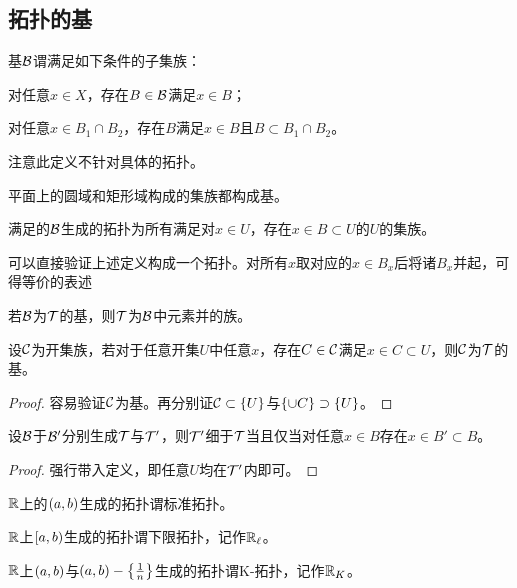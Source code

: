 \documentclass{ctexrep}
\begin{document}
  \subsection{拓扑的基}
  \begin{definition}
  \label{def:tb}
  基$\mathcal{B}$谓满足如下条件的子集族：
  \begin{cenum}
    \item 对任意$x\in X$，存在$B\in\mathcal{B}$满足$x\in B$；
    \item 对任意$x\in B_1\cap B_2$，存在$B$满足$x\in B$且$B\subset B_1\cap B_2$。
  \end{cenum}
  \end{definition}
  注意此定义不针对具体的拓扑。
  \begin{ex}
  平面上的圆域和矩形域构成的集族都构成基。
  \end{ex}
  \begin{definition}
  满足的$\mathcal{B}$生成的拓扑为所有满足对$x\in U$，存在$x\in B\subset U$的$U$的集族。
  \end{definition}
  可以直接验证上述定义构成一个拓扑。对所有$x$取对应的$x\in B_x$后将诸$B_x$并起，可得等价的表述
  \begin{theorem}
  若$\mathcal{B}$为$\mathcal{T}$的基，则$\mathcal{T}$为$\mathcal{B}$中元素并的族。
  \end{theorem}
  \begin{theorem}
  设$\mathcal{C}$为开集族，若对于任意开集$U$中任意$x$，存在$C\in\mathcal{C}$满足$x\in C\subset U$，则$\mathcal{C}$为$\mathcal{T}$的基。
  \end{theorem}
  \begin{proof}
  容易验证$\mathcal{C}$为基。再分别证$\mathcal{C}\subset \left\{U\right\}$与$\left\{\cup C\right\}\supset \left\{U\right\}$。
  \end{proof}
  \begin{theorem}
  \label{thm:critfiner}
  设$\mathcal{B}$于$\mathcal{B}'$分别生成$\mathcal{T}$与$\mathcal{T}'$，则$\mathcal{T}'$细于$\mathcal{T}$当且仅当对任意$x\in B$存在$x\in B'\subset B$。
  \end{theorem}
  \begin{proof}
  强行带入定义，即任意$U$均在$\mathcal{T}'$内即可。
  \end{proof}
  \begin{definition}
  $\mathbb{R}$上的$\left(a,b\right)$生成的拓扑谓标准拓扑。
  \end{definition}
  \begin{definition}
  $\mathbb{R}$上$\left[a,b\right)$生成的拓扑谓下限拓扑，记作$\mathbb{R}_\ell$。
  \end{definition}
  \begin{definition}
  $\mathbb{R}$上$\left(a,b\right)$与$\left(a,b\right) - \left\{\frac{1}{n}\right\}$生成的拓扑谓K-拓扑，记作$\mathbb{R}_K$。
  \end{definition}
\end{document}

